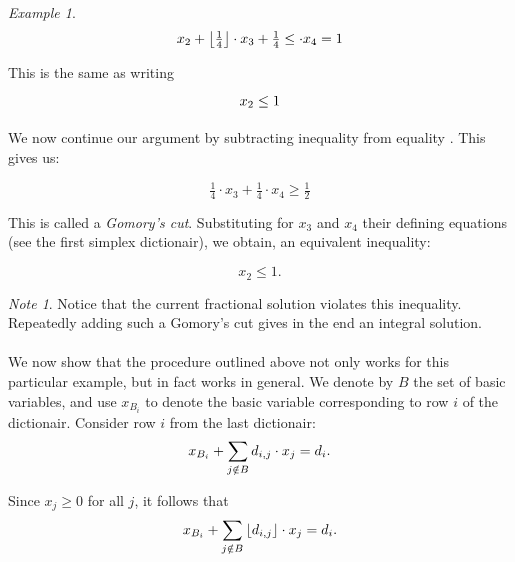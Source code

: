 \documentclass[titlepage]{book}
\makeatletter
\newcommand{\concept}[1]{\toindex{#1}\indexlayout{#1}}
\newcommand{\indexlayout}[1]{\emph{#1}}
\newcommand\toindex{\@ifstar{\@dblarg{\@toindexs}}{\@toindex}}
\def\@toindexs[#1]#2{\index{#1@#2}}
\newcommand\@toindex[2][]{%
  \if\relax\detokenize{#1}\relax
    \begingroup
    \@splitword#2\@nil%
    \uppercase\expandafter{%
      \expandafter\def\expandafter\@initial\expandafter{\@first}}%
    \toks0=\expandafter{\@initial}%
    \toks2=\expandafter{\@rest}%
    \edef\x{\endgroup\noexpand\index{\the\toks0 \the\toks2 }}\x
  \else
    \index{#1}
  \fi
}
\def\@splitword#1#2\@nil{\def\@first{#1}\def\@rest{#2}}
\theoremstyle{plain}
\theoremstyle{definition}
\theoremstyle{remark}
\newtheorem{example}{Example}
\newtheorem{note}{Note}
\makeatother
\begin{document}
\begin{example}
\begin{equation}
x_2+\floor{\tfrac{1}{4}}\cdot x_3+\tfrac{1}{4}\leq\cdot x_4=1
\end{equation}

This is the same as writing

\begin{equation}
x_2\leq 1\eqnlab{cg-cut-eq2-fin}
\end{equation}

\paragraph{}
We now continue our argument by subtracting inequality  from equality . This gives us:

\begin{equation}
\tfrac{1}{4}\cdot x_3+\tfrac{1}{4}\cdot x_4\geq\tfrac{1}{2}
\end{equation}

This is called a \concept{Gomory's cut}. Substituting for $x_3$ and $x_4$ their defining equations (see the first simplex dictionair), we obtain, an equivalent inequality:

\begin{equation}
x_2\leq 1.
\end{equation}
\end{example}

\begin{note}
Notice that the current fractional solution violates this inequality. Repeatedly adding such a Gomory's cut gives in the end an integral solution.
\end{note}

\paragraph{}
We now show that the procedure outlined above not only works for this particular example, but in fact works in general. We denote by $B$ the set of basic variables, and use $x_{B_i}$ to denote the basic variable corresponding to row $i$ of the dictionair. Consider row $i$ from the last dictionair:
\begin{equation}
x_{B_i}+\sumndomain[j]{B}{d_{i,j}\cdot x_j}=d_i.\eqnlab{gc-theory1}
\end{equation}

Since $x_j\geq 0$ for all $j$, it follows that 
\begin{equation}
x_{B_i}+\sumndomain[j]{B}{\floor{d_{i,j}}\cdot x_j}=d_i.
\end{equation}
\end{document}
